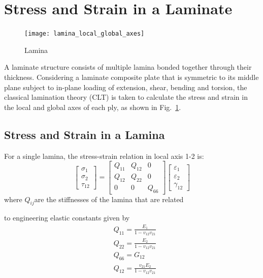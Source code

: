 \documentclass[USenglish,twocolumn]{article}
\begin{document}
\section{Stress and Strain in a Laminate}
\begin{figure}[!htb]
	\centering
	\texttt{[image: lamina\_local\_global\_axes]}
\caption{Lamina}
  	\label{fig:lamina}
\end{figure}
A laminate structure consists of multiple lamina bonded together through their thickness.
Considering a laminate composite plate that is symmetric to its middle plane subject to in-plane
loading of extension, shear, bending and torsion, the classical lamination theory (CLT) is taken to
calculate the stress and strain in the local and global axes of each ply, as shown in
Fig.~\ref{fig:lamina}.




\subsection{Stress and Strain in a Lamina}
For a single lamina, the stress-strain relation in local axis 1-2 is:
\begin{equation}
    \begin{bmatrix}
        \sigma _1\\
        \sigma _2\\
        \tau_{12}
    \end{bmatrix}
    =
    \begin{bmatrix}
        Q_{11} & Q_{12} & 0\\
        Q_{12} & Q_{22} & 0\\
        0      &  0     & Q_{66}
    \end{bmatrix}
    \begin{bmatrix}
        \varepsilon_1\\
        \varepsilon_2\\\gamma_{12}
    \end{bmatrix}
\end{equation}
where $Q_{ij} $are the stiffnesses of the lamina that are related

to engineering elastic constants given by
\begin{equation}
    \begin{split}
    &Q_{11}=\frac{E_1}{1-v_{12}v_{21}}\\
    &Q_{22}=\frac{E_2}{1-v_{12}v_{21}}\\
    &Q_{66}=G_{12}\\
    &Q_{12}=\frac{v_{21}E_2}{1-v_{12}v_{21}}\\
    \end{split}
\end{equation}
\end{document}
